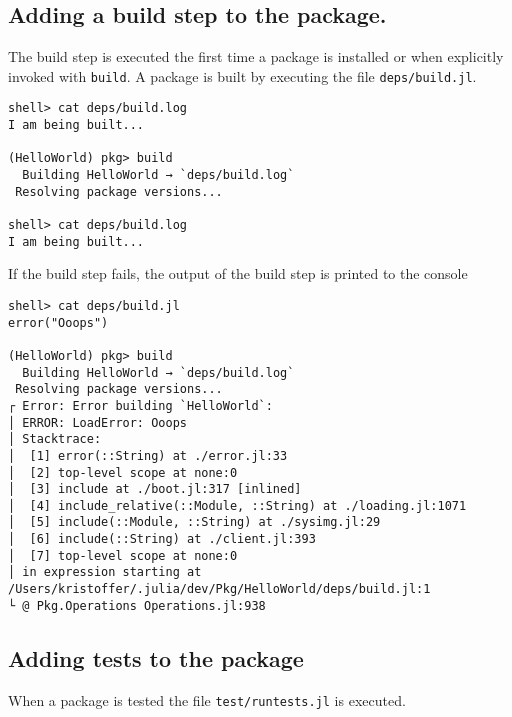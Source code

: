 \hypertarget{7089821536805504415}{}


\subsection{Adding a build step to the package.}



The build step is executed the first time a package is installed or when explicitly invoked with \texttt{build}. A package is built by executing the file \texttt{deps/build.jl}.




\begin{lstlisting}
shell> cat deps/build.log
I am being built...

(HelloWorld) pkg> build
  Building HelloWorld → `deps/build.log`
 Resolving package versions...

shell> cat deps/build.log
I am being built...
\end{lstlisting}



If the build step fails, the output of the build step is printed to the console




\begin{lstlisting}
shell> cat deps/build.jl
error("Ooops")

(HelloWorld) pkg> build
  Building HelloWorld → `deps/build.log`
 Resolving package versions...
┌ Error: Error building `HelloWorld`:
│ ERROR: LoadError: Ooops
│ Stacktrace:
│  [1] error(::String) at ./error.jl:33
│  [2] top-level scope at none:0
│  [3] include at ./boot.jl:317 [inlined]
│  [4] include_relative(::Module, ::String) at ./loading.jl:1071
│  [5] include(::Module, ::String) at ./sysimg.jl:29
│  [6] include(::String) at ./client.jl:393
│  [7] top-level scope at none:0
│ in expression starting at /Users/kristoffer/.julia/dev/Pkg/HelloWorld/deps/build.jl:1
└ @ Pkg.Operations Operations.jl:938
\end{lstlisting}



\hypertarget{4923930195335946322}{}


\subsection{Adding tests to the package}



When a package is tested the file \texttt{test/runtests.jl} is executed.




